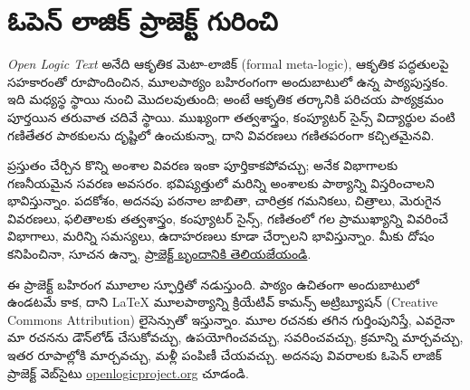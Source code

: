 \chapter*{ఓపెన్ లాజిక్ ప్రాజెక్ట్ గురించి}


\textit{Open Logic Text} అనేది ఆకృతిక మెటా-లాజిక్ (formal meta-logic),
ఆకృతిక పద్ధతులపై సహకారంతో రూపొందించిన, మూలపాఠ్యం బహిరంగంగా
అందుబాటులో ఉన్న పాఠ్యపుస్తకం. ఇది మధ్యస్థ స్థాయి నుంచి మొదలవుతుంది;
అంటే ఆకృతిక తర్కానికి పరిచయ పాఠ్యక్రమం పూర్తయిన
తరువాత చదివే స్థాయి. ముఖ్యంగా తత్వశాస్త్రం, కంప్యూటర్ సైన్స్
విద్యార్థుల వంటి గణితేతర పాఠకులను దృష్టిలో ఉంచుకున్నా, దాని
వివరణలు గణితపరంగా కచ్చితమైనవి.

ప్రస్తుతం చేర్చిన కొన్ని అంశాల వివరణ ఇంకా పూర్తికాకపోవచ్చు;
అనేక విభాగాలకు గణనీయమైన సవరణ అవసరం. భవిష్యత్తులో మరిన్ని
అంశాలకు పాఠ్యాన్ని విస్తరించాలని భావిస్తున్నాం. పదకోశం, అదనపు
పఠనాల జాబితా, చారిత్రక గమనికలు, చిత్రాలు, మెరుగైన వివరణలు,
ఫలితాలకు తత్వశాస్త్రం, కంప్యూటర్ సైన్స్, గణితంలో గల ప్రాముఖ్యాన్ని
వివరించే విభాగాలు, మరిన్ని సమస్యలు, ఉదాహరణలు కూడా
చేర్చాలని భావిస్తున్నాం. మీకు దోషం కనిపించినా, సూచన ఉన్నా,
\href{https://github.com/OpenLogicProject/OpenLogic/wiki/Contributing}{ప్రాజెక్ట్ బృందానికి తెలియజేయండి}.

ఈ ప్రాజెక్ట్ బహిరంగ మూలాల స్ఫూర్తితో నడుస్తుంది. పాఠ్యం ఉచితంగా
అందుబాటులో ఉండటమే కాక, దాని LaTeX మూలపాఠ్యాన్ని క్రియేటివ్ కామన్స్
అట్రిబ్యూషన్ (Creative Commons Attribution) లైసెన్సుతో ఇస్తున్నాం.
మూల రచనకు తగిన గుర్తింపునిస్తే, ఎవరైనా మా రచనను
డౌన్‌లోడ్ చేసుకోవచ్చు, ఉపయోగించవచ్చు, సవరించవచ్చు, క్రమాన్ని
మార్చవచ్చు, ఇతర రూపాల్లోకి మార్చవచ్చు, మళ్లీ పంపిణీ చేయవచ్చు.
అదనపు వివరాలకు ఓపెన్ లాజిక్ ప్రాజెక్ట్ వెబ్‌సైటు
\href{http://openlogicproject.org/}{openlogicproject.org} చూడండి.
